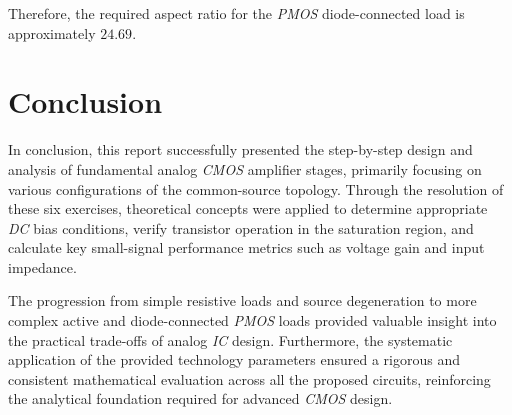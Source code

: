 \documentclass[12pt,a4paper]{article}
\begin{document}
Therefore, the required aspect ratio for the \textit{PMOS} diode-connected load is approximately $24.69$.



\newpage
\section{Conclusion}                                                \label{sec_8}
In conclusion, this report successfully presented the step-by-step design and analysis of fundamental analog \textit{CMOS} amplifier stages, primarily focusing on various configurations of the common-source topology. Through the resolution of these six exercises, theoretical concepts were applied to determine appropriate \textit{DC} bias conditions, verify transistor operation in the saturation region, and calculate key small-signal performance metrics such as voltage gain and input impedance. 

The progression from simple resistive loads and source degeneration to more complex active and diode-connected \textit{PMOS} loads provided valuable insight into the practical trade-offs of analog \textit{IC} design. Furthermore, the systematic application of the provided technology parameters ensured a rigorous and consistent mathematical evaluation across all the proposed circuits, reinforcing the analytical foundation required for advanced \textit{CMOS} design.



\printbibliography[heading=bibintoc, title={9 \, Bibliography}]
\end{document}

